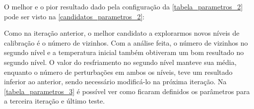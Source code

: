 \documentclass[
	12pt,				%
	twoside,			%
	a4paper,			%
	english,			%
	french,				%
	spanish,			%
	brazil				%
	]{abntex2}
\begin{document}
O melhor e o pior resultado dado pela configuração da
\autoref{tabela_parametros_2} pode ser visto na
\autoref{candidatos_parametros_2}:

\begin{table}[ht]
\centering
\caption{Métricas coletadas para a combinação de níveis dos parâmetros da segunda iteração.}
\label{candidatos_parametros_2}
\end{table}

Como na iteração anterior, o melhor candidato a explorarmos novos níveis
de calibração é o número de vizinhos. Com a análise feita, o número de
vizinhos no segundo nível e a temperatura inicial também obtiveram um
bom resultado no segundo nível. O valor do resfriamento no segundo nível
manteve sua média, enquanto o número de perturbações em ambos os níveis,
teve um resultado inferior ao anterior, sendo necessário modificá-lo na
próxima iteração. Na \autoref{tabela_parametros_3} é possível ver como
ficaram definidos os parâmetros para a terceira iteração e último teste.
\end{document}
